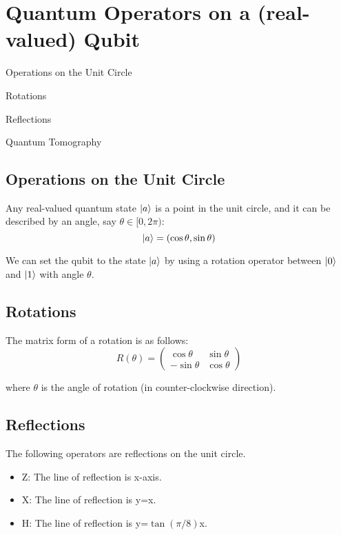 \section{Quantum Operators on a (real-valued) Qubit}
\begin{introduction}
	\item Operations on the Unit Circle
	\item Rotations
	\item Reflections
	\item Quantum Tomography
\end{introduction}

\subsection{Operations on the Unit Circle}
Any real-valued quantum state $\ket{a}$ is a point in the unit circle, and it can be described by an angle, say $\theta\in [0, 2\pi)$:
\begin{equation*}
	\ket{a} = (\cos\theta, \sin\theta)
\end{equation*}

We can set the qubit to the state $\ket{a}$ by using a rotation operator between $\ket{0}$ and $\ket{1}$ with angle $\theta$.

\subsection{Rotations}
The matrix form of a rotation is as follows:
\begin{equation*}
	R(\theta)=\begin{pmatrix}
		          \cos\theta & \sin\theta\\ -\sin\theta & \cos\theta
	\end{pmatrix}
\end{equation*}

where $\theta$ is the angle of rotation (in counter-clockwise direction).

\subsection{Reflections}
The following operators are reflections on the unit circle.
\begin{itemize}
	\item Z: The line of reflection is x-axis.
	\item X: The line of reflection is y=x.
	\item H: The line of reflection is y=$\tan(\pi/8)$x.
\end{itemize}

